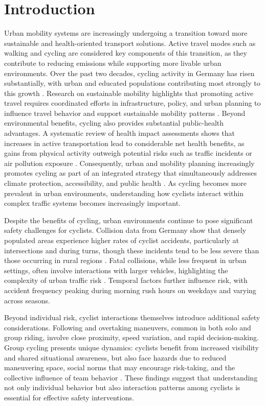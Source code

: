 \chapter{Introduction}

Urban mobility systems are increasingly undergoing a transition toward more sustainable and health-oriented transport solutions. Active travel modes such as walking and cycling are considered key components of this transition, as they contribute to reducing emissions while supporting more livable urban environments. 
Over the past two decades, cycling activity in Germany has risen substantially, with urban and educated populations contributing most strongly to this growth \cite{hudde_unequal_2022}. 
Research on sustainable mobility highlights that promoting active travel requires coordinated efforts in infrastructure, policy, and urban planning to influence travel behavior and support sustainable mobility patterns \cite{lattman_sustainable_2024}. 
Beyond environmental benefits, cycling also provides substantial public-health advantages. A systematic review of health impact assessments shows that increases in active transportation lead to considerable net health benefits, as gains from physical activity outweigh potential risks such as traffic incidents or air pollution exposure \cite{mueller_health_2015}. 
Consequently, urban and mobility planning increasingly promotes cycling as part of an integrated strategy that simultaneously addresses climate protection, accessibility, and public health \cite{kopal_healthy_2023}. As cycling becomes more prevalent in urban environments, understanding how cyclists interact within complex traffic systems becomes increasingly important.


Despite the benefits of cycling, urban environments continue to pose significant safety challenges for cyclists. Collision data from Germany show that densely populated areas experience higher rates of cyclist accidents, particularly at intersections and during turns, though these incidents tend to be less severe than those occurring in rural regions \cite{harkort_spatiotemporal_2023}. Fatal collisions, while less frequent in urban settings, often involve interactions with larger vehicles, highlighting the complexity of urban traffic risk \cite{bil_critical_2010}. Temporal factors further influence risk, with accident frequency peaking during morning rush hours on weekdays and varying across seasons.

Beyond individual risk, cyclist interactions themselves introduce additional safety considerations. Following and overtaking maneuvers, common in both solo and group riding, involve close proximity, speed variation, and rapid decision-making. Group cycling presents unique dynamics: cyclists benefit from increased visibility and shared situational awareness, but also face hazards due to reduced maneuvering space, social norms that may encourage risk-taking, and the collective influence of team behavior \cite{heeremans_group_2022}. These findings suggest that understanding not only individual behavior but also interaction patterns among cyclists is essential for effective safety interventions.


